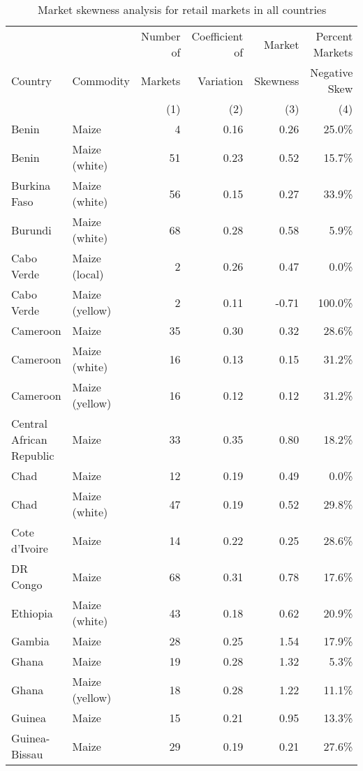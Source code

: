 \begin{table}[ht!]
	\centering
	\begin{threeparttable}[t]
		\caption{Market skewness analysis for retail markets in all countries}
		\label{tab:skew_retail}
		\begin{tabular}{|ll|rrrr|}
			\hline
			& & Number of & Coefficient of &  Market   & Percent Markets \\ 
			Country & Commodity & Markets & Variation & Skewness  &  Negative Skew \\ 
			& & (1) & (2) & (3) & (4) \\
  \hline
Benin & Maize &   4 & 0.16 & 0.26 & 25.0\% \\ 
  Benin & Maize (white) &  51 & 0.23 & 0.52 & 15.7\% \\ 
  Burkina Faso & Maize (white) &  56 & 0.15 & 0.27 & 33.9\% \\ 
  Burundi & Maize (white) &  68 & 0.28 & 0.58 & 5.9\% \\ 
  Cabo Verde & Maize (local) &   2 & 0.26 & 0.47 & 0.0\% \\ 
  Cabo Verde & Maize (yellow) &   2 & 0.11 & -0.71 & 100.0\% \\ 
  Cameroon & Maize &  35 & 0.30 & 0.32 & 28.6\% \\ 
  Cameroon & Maize (white) &  16 & 0.13 & 0.15 & 31.2\% \\ 
  Cameroon & Maize (yellow) &  16 & 0.12 & 0.12 & 31.2\% \\ 
  Central African Republic & Maize &  33 & 0.35 & 0.80 & 18.2\% \\ 
  Chad & Maize &  12 & 0.19 & 0.49 & 0.0\% \\ 
  Chad & Maize (white) &  47 & 0.19 & 0.52 & 29.8\% \\ 
  Cote d'Ivoire & Maize &  14 & 0.22 & 0.25 & 28.6\% \\ 
  DR Congo & Maize &  68 & 0.31 & 0.78 & 17.6\% \\ 
  Ethiopia & Maize (white) &  43 & 0.18 & 0.62 & 20.9\% \\ 
  Gambia & Maize &  28 & 0.25 & 1.54 & 17.9\% \\ 
  Ghana & Maize &  19 & 0.28 & 1.32 & 5.3\% \\ 
  Ghana & Maize (yellow) &  18 & 0.28 & 1.22 & 11.1\% \\ 
  Guinea & Maize &  15 & 0.21 & 0.95 & 13.3\% \\ 
  Guinea-Bissau & Maize &  29 & 0.19 & 0.21 & 27.6\% \\ 

\end{tabular}
\end{threeparttable}
\end{table}
